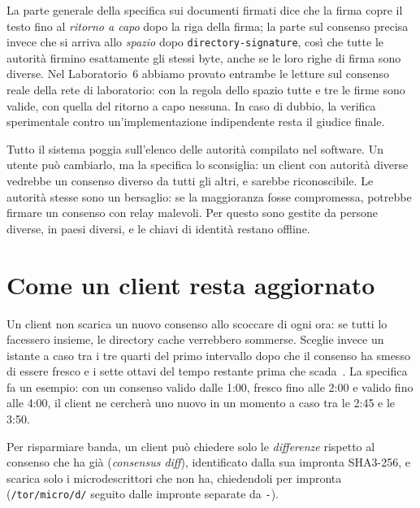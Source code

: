 \begin{approfondimento}
La parte generale della specifica sui documenti firmati dice che la firma copre il testo fino al \emph{ritorno a capo} dopo la riga della firma; la parte sul consenso precisa invece che si arriva allo \emph{spazio} dopo \texttt{directory-signature}, così che tutte le autorità firmino esattamente gli stessi byte, anche se le loro righe di firma sono diverse. Nel Laboratorio~6 abbiamo provato entrambe le letture sul consenso reale della rete di laboratorio: con la regola dello spazio tutte e tre le firme sono valide, con quella del ritorno a capo nessuna. In caso di dubbio, la verifica sperimentale contro un'implementazione indipendente resta il giudice finale.
\end{approfondimento}

\begin{attenzione}
Tutto il sistema poggia sull'elenco delle autorità compilato nel software. Un utente può cambiarlo, ma la specifica lo sconsiglia: un client con autorità diverse vedrebbe un consenso diverso da tutti gli altri, e sarebbe riconoscibile. Le autorità stesse sono un bersaglio: se la maggioranza fosse compromessa, potrebbe firmare un consenso con relay malevoli. Per questo sono gestite da persone diverse, in paesi diversi, e le chiavi di identità restano offline.
\end{attenzione}

\section{Come un client resta aggiornato}\label{sec:dir-client}

Un client non scarica un nuovo consenso allo scoccare di ogni ora: se tutti lo facessero insieme, le directory cache verrebbero sommerse. Sceglie invece un istante a caso tra i tre quarti del primo intervallo dopo che il consenso ha smesso di essere fresco e i sette ottavi del tempo restante prima che scada~. La specifica fa un esempio: con un consenso valido dalle 1:00, fresco fino alle 2:00 e valido fino alle 4:00, il client ne cercherà uno nuovo in un momento a caso tra le 2:45 e le 3:50.

Per risparmiare banda, un client può chiedere solo le \emph{differenze} rispetto al consenso che ha già (\emph{consensus diff}), identificato dalla sua impronta SHA3-256, e scarica solo i microdescrittori che non ha, chiedendoli per impronta (\nolinkurl{/tor/micro/d/} seguito dalle impronte separate da \texttt{-}).

